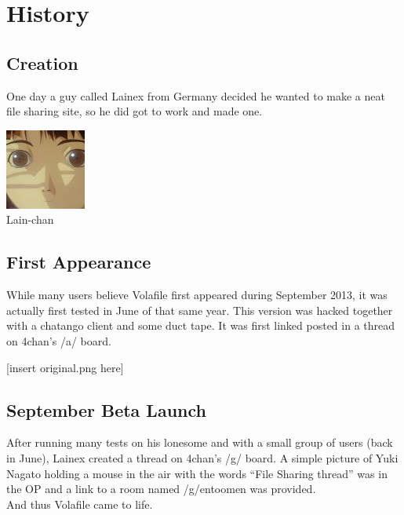 \documentclass[12pt]{report}
\begin{document}
{\vfill
\pagebreak

\chapter{History}

\section{Creation}
	One day a guy called Lainex from Germany decided he wanted to make a neat file sharing site, so he did got to work and made one.
	\begin{image}
		\flushright
		\includegraphics[scale=0.25]{lain.jpg}\\
		Lain-chan
		\label{fig:kawaii}
	\end{image}


\section{First Appearance}
	While many users believe Volafile first appeared during September 2013, it was actually first tested in June of that same year. This version was hacked together with a chatango client and some duct tape. It was first linked posted in a thread on 4chan's /a/ board.

[insert original.png here]

\vfill
\pagebreak


\section{September Beta Launch}
	After running many tests on his lonesome and with a small group of users (back in June), Lainex created a thread on 4chan's /g/ board.
	A simple picture of Yuki Nagato holding a mouse in the air with the words 
	``File Sharing thread'' was in the OP and a link to a room named /g/entoomen was provided.\footnotemark \\ 

	And thus Volafile came to life.

}
\end{document}
